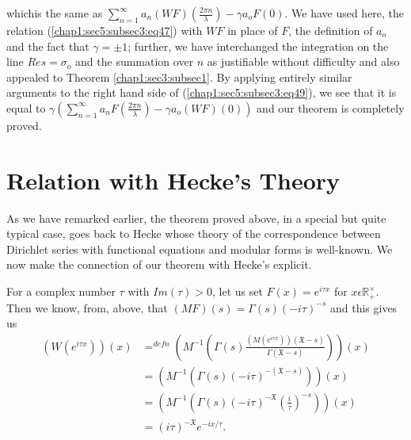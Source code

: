  which\pageoriginale is the same as
 $\sum\limits_{n=1}^{\infty}a_{n}(WF)\left(\frac{2\pi
   n}{\lambda}\right)-\gamma a_{o}F(0)$. We have used here, the
 relation (\ref{chap1:sec5:subsec3:eq47}) with $WF$ in place of  $F$, the definition of $a_{o}$
 and the fact that $\gamma=\pm 1$; further, we have interchanged the
 integration on the line $Res=\sigma_{o}$ and the summation over $n$
 as justifiable without difficulty and also appealed to Theorem
 \ref{chap1:sec3:subsec1}. By applying entirely similar arguments to
 the right hand side 
 of (\ref{chap1:sec5:subsec3:eq49}), we see that it is equal to
 $\gamma\left(\sum\limits_{n=1}^{\infty}a_{n}F\left(\frac{2\pi
   n}{\lambda}\right)-\gamma a_{o}(WF)(0)\right)$ and our theorem is
 completely proved.

\section{Relation with Hecke's Theory} %

 As we have remarked earlier, the theorem proved above, in a special
 but quite typical case, goes back to Hecke whose theory of the
 correspondence between Dirichlet series with functional equations and
 modular forms is well-known. We now make the connection of our
 theorem with Hecke's explicit. 

  For a complex number $\tau$ with $Im(\tau)>0$, let us set
  $F(x)=e^{i\tau x}$ for $x\epsilon \mathbb{R}_{+}^\times $. 
  Then we know, from, above, that
  $(MF)(s)=\Gamma(s)(-i\tau)^{-s}$ and this gives us
\begin{align*}
  (W(e^{i\tau
    x}))(x)& {\displaystyle{\mathop{=}^{defn}}}(M^{-1}(\Gamma(s)\frac{(M(e^{i\tau
      x}))(\mathfrak{X}-s)}{\Gamma(\mathfrak{X}-s)}))(x)\\
           & =(M^{-1}(\Gamma(s)(-i\tau)^{-(\mathfrak{X}-s)}))(x)\\ 
           & =(M^{-1}(\Gamma(s)(-i\tau)^{-\mathfrak{X}}
              \left(\frac{i}{\tau}\right)^{-s}))(x)\\
           & =(i\tau)^{-\mathfrak{X}}e^{-ix/\tau}.  
\end{align*}

